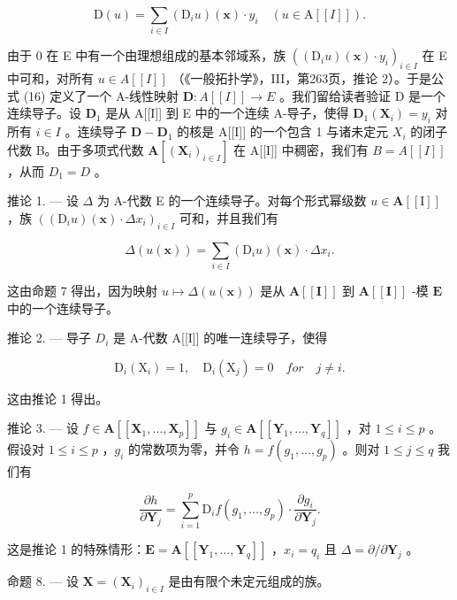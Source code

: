 \[
\mathrm{D} (u) = \sum_ {i \in I} (\mathrm{D} _ {i} u) (\mathbf {x}) \cdot y _ {i} \quad (u \in \mathrm{A} [ [ I ] ])  .\tag{16}
\]

由于 0 在 E 中有一个由理想组成的基本邻域系，族 \(((\mathrm{D}_i u)(\mathbf{x}) \cdot y_i)_{i \in I}\) 在 E 中可和，对所有 \(u \in A[[I]]\) （《一般拓扑学》，III，第263页，推论 2）。于是公式 (16) 定义了一个 A-线性映射 \(\mathbf{D}: A[[I]] \to E\) 。我们留给读者验证 D 是一个连续导子。设 \(\mathbf{D}_1\) 是从 A{[}{[}I{]}{]} 到 E 中的一个连续 A-导子，使得 \(\mathbf{D}_1(\mathbf{X}_i) = y_i\) 对所有 \(i \in I\) 。连续导子 \(\mathbf{D} - \mathbf{D}_1\) 的核是 A{[}{[}I{]}{]} 的一个包含 1 与诸未定元 \(X_{i}\) 的闭子代数 B。由于多项式代数 \(\mathbf{A}[(\mathbf{X}_{i})_{i\in I}]\) 在 A{[}{[}I{]}{]} 中稠密，我们有 \(B = A[[I]]\) ，从而 \(D_{1} = D\) 。

推论 1. --- 设 \(\Delta\) 为 A-代数 E 的一个连续导子。对每个形式幂级数 \(u \in \mathbf{A}[[\mathrm{I}]]\) ，族 \(((\mathrm{D}_i u)(\mathbf{x}) \cdot \Delta x_i)_{i \in I}\) 可和，并且我们有

\[
\Delta (u (\mathbf {x})) = \sum_ {i \in I} \left(\mathrm{D} _ {i} u\right) (\mathbf {x}) \cdot \Delta x _ {i}.\tag{17}
\]

这由命题 7 得出，因为映射 \(u \mapsto \Delta(u(\mathbf{x}))\) 是从 \(\mathbf{A}[[\mathbf{I}]]\) 到 \(\mathbf{A}[[\mathbf{I}]]\) -模 \(\mathbf{E}\) 中的一个连续导子。

推论 2. --- 导子 \(D_{i}\) 是 A-代数 A{[}{[}I{]}{]} 的唯一连续导子，使得

\[
\mathrm{D} _ {i} (\mathrm{X} _ {i}) = 1, \quad \mathrm{D} _ {i} (\mathrm{X} _ {j}) = 0 \quad f o r \quad j \neq i.\tag{18}
\]

这由推论 1 得出。

推论 3. --- 设 \(f \in \mathbf{A}[[\mathbf{X}_1, \ldots, \mathbf{X}_p]]\) 与 \(g_i \in \mathbf{A}[[\mathbf{Y}_1, \ldots, \mathbf{Y}_q]]\) ，对 \(1 \leqslant i \leqslant p\) 。假设对 \(1 \leqslant i \leqslant p\) ，\(g_i\) 的常数项为零，并令 \(h = f(g_1, \ldots, g_p)\) 。则对 \(1 \leqslant j \leqslant q\) 我们有

\[
\frac {\partial h}{\partial \mathbf {Y} _ {j}} = \sum_ {i = 1} ^ {p} \mathrm{D} _ {i} f (g _ {1}, \dots , g _ {p}) \cdot \frac {\partial g _ {i}}{\partial \mathbf {Y} _ {j}}.\tag{19}
\]

这是推论 1 的特殊情形：\(\mathbf{E} = \mathbf{A}[[\mathbf{Y}_1,\dots ,\mathbf{Y}_q]]\) ，\(x_{i} = q_{i}\) 且 \(\Delta = \partial /\partial \mathbf{Y}_j\) 。

命题 8. --- 设 \(\mathbf{X} = (\mathbf{X}_i)_{i\in I}\) 是由有限个未定元组成的族。

